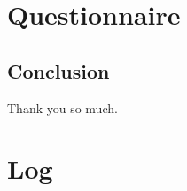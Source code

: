 \documentclass[letterpaper, 11pt]{article}
\title{\deliv{\srs}{Interview}}
\date{\datesrs}
\begin{document}
\maketitle
\tableofcontents
\thispagestyle{fancy}

\begin{flushleft}


\section{Questionnaire}







\subsection{Conclusion}
Thank you so much.


\section{Log}








\end{flushleft}
\end{document}
